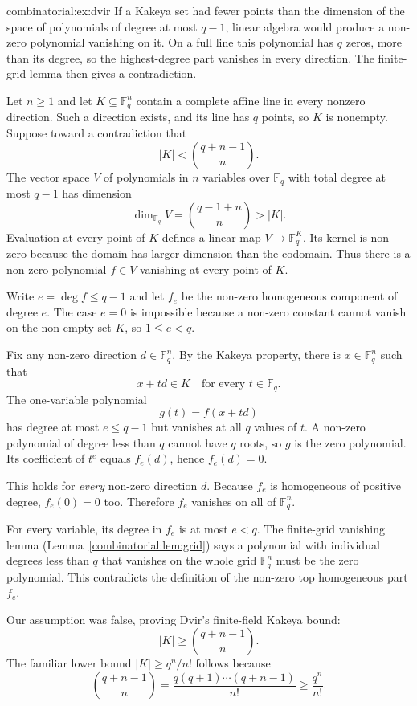 \begin{solution}{combinatorial:ex:dvir}
\idea If a Kakeya set had fewer points than the dimension of the space of polynomials of degree at most $q-1$, linear algebra would produce a non-zero polynomial vanishing on it. On a full line this polynomial has $q$ zeros, more than its degree, so the highest-degree part vanishes in every direction. The finite-grid lemma then gives a contradiction.

\writeup Let $n\ge1$ and let $K\subseteq\mathbb F_q^n$ contain a complete affine
line in every nonzero direction. Such a direction exists, and its line has
$q$ points, so $K$ is nonempty. Suppose toward a contradiction that
\[
|K|<\binom{q+n-1}{n}.
\]
The vector space $V$ of polynomials in $n$ variables over $\mathbb F_q$ with total degree at most $q-1$ has dimension
\[
\dim_{\mathbb F_q}V=\binom{q-1+n}{n}>|K|.
\]
Evaluation at every point of $K$ defines a linear map $V\to\mathbb F_q^{K}$. Its kernel is non-zero because the domain has larger dimension than the codomain. Thus there is a non-zero polynomial $f\in V$ vanishing at every point of $K$.

Write $e=\deg f\le q-1$ and let $f_e$ be the non-zero homogeneous component of degree $e$. The case $e=0$ is impossible because a non-zero constant cannot vanish on the non-empty set $K$, so $1\le e<q$.

Fix any non-zero direction $d\in\mathbb F_q^n$. By the Kakeya property, there is $x\in\mathbb F_q^n$ such that
\[
x+td\in K\quad\text{for every }t\in\mathbb F_q.
\]
The one-variable polynomial
\[
g(t)=f(x+td)
\]
has degree at most $e\le q-1$ but vanishes at all $q$ values of $t$. A non-zero polynomial of degree less than $q$ cannot have $q$ roots, so $g$ is the zero polynomial. Its coefficient of $t^e$ equals $f_e(d)$, hence $f_e(d)=0$.

This holds for \emph{every} non-zero direction $d$. Because $f_e$ is homogeneous of positive degree, $f_e(0)=0$ too. Therefore $f_e$ vanishes on all of $\mathbb F_q^n$.

For every variable, its degree in $f_e$ is at most $e<q$. The finite-grid vanishing lemma (Lemma~\ref{combinatorial:lem:grid}) says a polynomial with individual degrees less than $q$ that vanishes on the whole grid $\mathbb F_q^n$ must be the zero polynomial. This contradicts the definition of the non-zero top homogeneous part $f_e$.

Our assumption was false, proving Dvir's finite-field Kakeya bound:
\[
\boxed{|K|\ge\binom{q+n-1}{n}}.
\]
The familiar lower bound $|K|\ge q^n/n!$ follows because
\[
\binom{q+n-1}{n}
=\frac{q(q+1)\cdots(q+n-1)}{n!}\ge\frac{q^n}{n!}.
\]
\end{solution}

